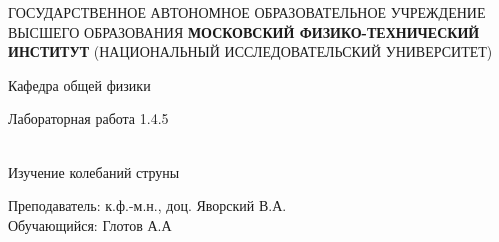 \documentclass[12pt,a4paper]{article}
\author{Глотов Алексей}
\begin{document}
\newpage
\begin{center}
\footnotesize{{ГОСУДАРСТВЕННОЕ АВТОНОМНОЕ ОБРАЗОВАТЕЛЬНОЕ УЧРЕЖДЕНИЕ}\break
{ВЫСШЕГО ОБРАЗОВАНИЯ}
\break
{\bf {МОСКОВСКИЙ ФИЗИКО-ТЕХНИЧЕСКИЙ ИНСТИТУТ}}
\break
\small{(НАЦИОНАЛЬНЫЙ ИССЛЕДОВАТЕЛЬСКИЙ УНИВЕРСИТЕТ)}}
\break
\hfill \break
\hfill \break
\begin{center}
\normalsize{Кафедра общей физики}
\end{center}
\hfill \break
\hfill \break
\hfill \break
\hfill \break

\begin{center}
\normalsize {Лабораторная работа 1.4.5}
\end{center}
\hfill \break\\
\large{Изучение колебаний струны}
\end{center}
\begin{flushleft}
\hfill \break
\hfill \break
\hfill \break
\hfill \break
\hfill \break
\hfill \break
\hfill \break
\hfill \break
\hfill \break
\hfill \break
\hangindent=9cm
\normalsize{Преподаватель:}\hfill
\normalsize{к.ф.-м.н., доц. Яворский В.А.}\\
\hfill \break
\normalsize{Обучающийся:}\hfill
\normalsize{Глотов А.А} \\
\hfill \break
\end{flushleft}
\hfill \break
\hfill \break
\hfill \break
\hfill \break
\hfill \break
\hfill \break
\hfill \break
\hfill \break
\hfill \break
\hfill \break
\hfill \break
\end{document}
